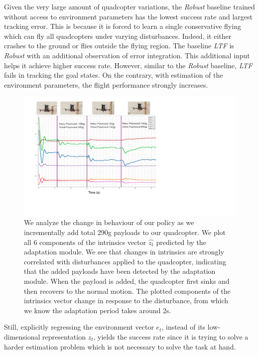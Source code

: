 Given the very large amount of quadcopter variations, the \emph{Robust} baseline trained without access to environment parameters has the lowest success rate and largest tracking error. This is because it is forced to learn a single conservative flying which can fly all quadcopters under varying disturbances.
%
Indeed, it either crashes to the ground or flies outside the flying region.
%
The baseline \emph{LTF} is \emph{Robust} with an additional observation of error integration. This additional input helps it achieve higher success rate. However, similar to the \emph{Robust} baseline, \emph{LTF} fails in tracking the goal states. 
%
On the contrary, with estimation of the environment parameters, the flight performance strongly increases.
%
\begin{figure}[t]
    \centering
    \includegraphics[width=\columnwidth]{img/extrinsics_plot_timescale.pdf}
    \caption{We analyze the change in behaviour of our policy as we incrementally add total 290g payloads to our quadcopter. We plot all 6 components of the intrinsics vector $\hat{z_t}$ predicted by the adaptation module. We see that changes in intrinsics are strongly correlated with disturbances applied to the quadcopter, indicating that the added payloads have been detected by the adaptation module. When the payload is added, the quadcopter first sinks and then recovers to the normal motion. The plotted components of the intrinsics vector change in response to the disturbance, from which we know the adaptation period takes around 2s.}
    \label{fig:intrinsics_analysis}
\end{figure}
%
Still, explicitly regressing the environment vector $e_t$, instead of its low-dimensional representation $z_t$, yields the success rate since it is trying to solve a harder estimation problem which is not necessary to solve the task at hand.
%
